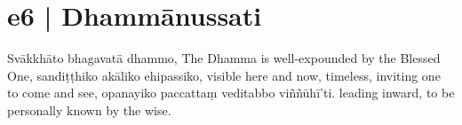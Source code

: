 \section*{e6 | Dhammānussati}

\begin{chantsubsection}
\end{chantsubsection}

\begin{chantsubsection}
  \chantlineinline
    {Svākkhāto bhagavatā dhammo,}
    {The Dhamma is well-expounded by the Blessed One,}
  \chantlineinline
    {sandiṭṭhiko akāliko ehipassiko,}
    {visible here and now, timeless, inviting one to come and see,}
  \chantlineinline
    {opanayiko paccattaṃ veditabbo viññūhī’ti.}
    {leading inward, to be personally known by the wise.}
\end{chantsubsection}
